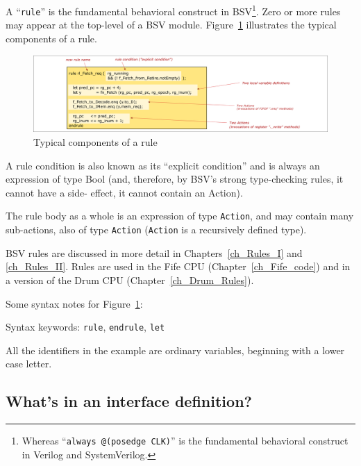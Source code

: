 A ``\verb|rule|'' is the fundamental behavioral construct in
BSV\footnote{Whereas ``{\tt always @(posedge CLK)}'' is the
fundamental behavioral construct in Verilog and SystemVerilog.}. Zero
or more rules may appear at the top-level of a BSV module.
Figure~\ref{Fig_BSV_whats_in_a_rule} illustrates the typical
components of a rule.

\begin{figure}[htbp]
  \centerline{\includegraphics[width=6in,angle=0]{Figures/Fig_BSV_whats_in_a_rule}}
  \caption{\label{Fig_BSV_whats_in_a_rule}
           Typical components of a rule}
\end{figure}

A rule condition is also known as its ``explicit condition'' and is
always an expression of type Bool (and, therefore, by BSV's strong
type-checking rules, it cannot have a side- effect, {\ie} it cannot
contain an Action).

The rule body as a whole is an expression of type \verb|Action|, and
may contain many sub-actions, also of type \verb|Action|
(\verb|Action| is a recursively defined type).

BSV rules are discussed in more detail in Chapters~\ref{ch_Rules_I}
and \ref{ch_Rules_II}.  Rules are used in the Fife CPU
(Chapter~\ref{ch_Fife_code}) and in a version of the Drum CPU
(Chapter~\ref{ch_Drum_Rules}).

Some syntax notes for Figure~\ref{Fig_BSV_whats_in_a_rule}:

\begin{tightlist}

 \item Syntax keywords: \verb|rule|, \verb|endrule|, \verb|let|

 \item All the identifiers in the example are ordinary variables,
       beginning with a lower case letter.

\end{tightlist}


\subsection{What's in an interface definition?}

